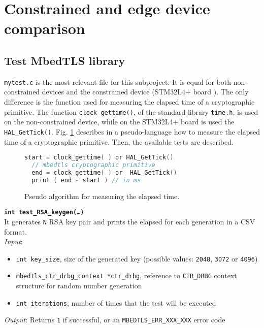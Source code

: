 
\section{Constrained and edge device comparison}
\subsection{Test MbedTLS library}
\texttt{mytest.c} is the most relevant file for this subproject. It is equal for both non-constrained devices and the constrained device (STM32L4+ board \cite{stm32-board-product}). The only difference is the function used for measuring the elapsed time of a cryptographic primitive. The function \texttt{clock\_gettime()}, of the standard library \texttt{time.h}, is used on the non-constrained device, while on the STM32L4+ board is used the \texttt{HAL\_GetTick()}. Fig. \ref{pseudo-algo} describes in a pseudo-language how to measure the elapsed time of a cryptographic primitive. 
Then, the available tests are described. \\
\begin{figure}[H]
\begin{lstlisting}[language=C,frame=single]
  start = clock_gettime( ) or HAL_GetTick()
  // mbedtls cryptographic primitive
  end = clock_gettime( ) or  HAL_GetTick()
  print ( end - start ) // in ms
\end{lstlisting}
\caption{Pseudo algorithm for measuring the elapsed time. \label{pseudo-algo}}
\end{figure}

\noindent
\texttt{\bfseries int test\_RSA\_keygen(\dots)}\\
It generates \texttt{N} RSA key pair and prints the elapsed for each generation in a CSV format. \\
\textit{Input}:
\begin{itemize}[noitemsep,nolistsep]
  \item \texttt{int key\_size}, size of the generated key (possible values: \texttt{2048}, \texttt{3072} or \texttt{4096})
  \item \texttt{mbedtls\_ctr\_drbg\_context *ctr\_drbg}, reference to \texttt{CTR\_DRBG} context structure for random number generation
  \item \texttt{int iterations}, number of times that the test will be executed
\end{itemize}
\textit{Output}: Returns \texttt{1} if successful, or an \texttt{MBEDTLS\_ERR\_XXX\_XXX} error code \\



